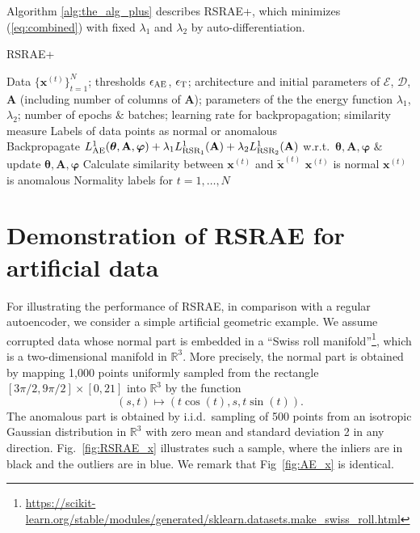 \documentclass{article} \usepackage{iclr2020_conference,times}
\def\eqref#1{(\ref{#1})}
\def\rvepsilon{{\mathbf{\epsilon}}}
\def\rvx{{\mathbf{x}}}
\def\rmA{{\mathbf{A}}}
\def\vtheta{{\bm{\theta}}}
\def\vvarphi{{\bm{\varphi}}}
\newcommand{\R}{\mathbb{R}}
\begin{document}
Algorithm \ref{alg:the_alg_plus} describes RSRAE+, which minimizes \eqref{eq:combined} with fixed $\lambda_1$ and $\lambda_2$ by auto-differentiation.



 \begin{algorithm}[ht] 
 \caption{RSRAE+
}
 \label{alg:the_alg_plus}
 \begin{algorithmic}[1]
 \renewcommand{\algorithmicrequire}{\textbf{Input:}}
 \renewcommand{\algorithmicensure}{\textbf{Output:}}
 \REQUIRE Data $\{\rvx^{(t)}\}_{t=1}^N$; thresholds $\rvepsilon_{\rm{AE}}$, $\rvepsilon_{\rm{T}}$;  architecture and initial parameters of $\mathscr{E}$, $\mathscr{D}$, $\rmA$ (including number of columns of $\rmA$); parameters of the the energy function $\lambda_1$, $\lambda_2$; number of epochs $\&$ batches; learning rate for backpropagation; similarity measure
 \ENSURE  Labels of data points as normal or anomalous \\

  \IF {$L_{\rm{AE}}^1(\vtheta, \rmA, \vvarphi)>\rvepsilon_{\rm{AE}}$}
  \STATE Backpropagate $L_{\rm{AE}}^1(\vtheta, \rmA, \vvarphi) + \lambda_1 L_{\rm{RSR_{1}}}^1(\rmA) + \lambda_2 L_{\rm{RSR_{2}}}^1(\rmA)$ w.r.t.~$\vtheta, \rmA, \vvarphi$ $\&$ update $\vtheta, \rmA, \vvarphi$
  \ENDIF
  \ENDFOR
  \ENDFOR
  \STATE Calculate similarity between
  $\rvx^{(t)}$ and $\tilde{\rvx}^{(t)}$
  \IF {similarity $\geq$  $\rvepsilon_{\rm{T}}$}
  \STATE $\rvx^{(t)}$ is normal
  \ELSE
 \STATE $\rvx^{(t)}$ is anomalous
 \ENDIF
 \ENDFOR
 \RETURN Normality labels for $t = 1, \ldots, N$
 \end{algorithmic} 
 \end{algorithm}

\newpage

\section{Demonstration of RSRAE for artificial data}
\label{sec:artificial}

For illustrating the performance of RSRAE, in comparison with a regular autoencoder, we consider a simple artificial geometric example.
We assume corrupted data whose normal part is embedded in a ``Swiss roll manifold''\footnote{\url{https://scikit-learn.org/stable/modules/generated/sklearn.datasets.make\_swiss\_roll.html}}, which is a two-dimensional manifold in $\R^3$. More precisely, the normal part is obtained by mapping 1,000 points uniformly sampled from the rectangle $[3\pi/2, 9\pi/2] \times [0, 21]$ into $\R^3$ by the function
\begin{equation}
    (s,t) \mapsto (t\cos(t), s, t\sin(t)).
\end{equation} 
The anomalous part is obtained by i.i.d.~sampling of 500 points from an isotropic Gaussian distribution in $\R^3$ with zero mean and standard deviation 2 in any direction. Fig.~\ref{fig:RSRAE_x} illustrates such a sample, where the inliers are in black and the outliers are in blue. We remark that Fig~\ref{fig:AE_x} is identical.
\end{document}
